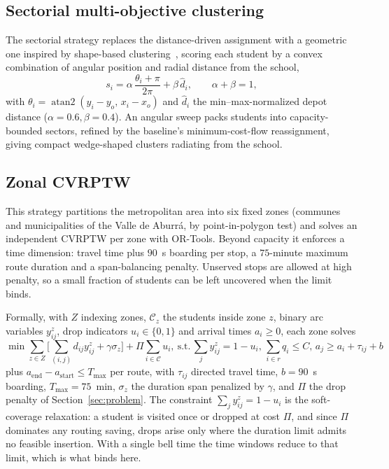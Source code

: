 \documentclass[graybox]{SNmult}
\begin{document}
\subsection{Sectorial multi-objective clustering}
The sectorial strategy replaces the distance-driven assignment with a
geometric one inspired by shape-based
clustering~\cite{CakirRevisitingProblem}, scoring each student by a convex
combination of angular position and radial distance from the school,
\begin{equation}
s_i=\alpha\,\frac{\theta_i+\pi}{2\pi}+\beta\,\hat d_i,
\qquad \alpha+\beta=1,
\label{eq:sectorial-score}
\end{equation}
with $\theta_i=\operatorname{atan2}(y_i-y_o,\,x_i-x_o)$ and $\hat d_i$ the
min--max-normalized depot distance ($\alpha=0.6,\beta=0.4$). An angular
sweep packs students into capacity-bounded sectors, refined by the
baseline's minimum-cost-flow reassignment, giving compact wedge-shaped
clusters radiating from the school.

\subsection{Zonal CVRPTW}\label{sec:cvrptw}
This strategy partitions the metropolitan area into six fixed zones
(communes and municipalities of the Valle de Aburr\'a, by
point-in-polygon test) and solves an independent CVRPTW per zone with
OR-Tools. Beyond capacity it enforces a time dimension: travel time plus
$90$~s boarding per stop, a $75$-minute maximum route duration and a
span-balancing penalty. Unserved stops are allowed at high penalty, so a
small fraction of students can be left uncovered when the limit binds.

Formally, with $Z$ indexing zones, $\mathcal{C}_z$ the students inside
zone $z$, binary arc variables $y^z_{ij}$, drop indicators
$u_i\in\{0,1\}$ and arrival times $a_i\ge0$, each zone solves
\begin{equation}
\min \sum_{z\in Z}\big[\sum_{(i,j)} d_{ij}y^z_{ij} + \gamma\sigma_z\big]
 + \Pi\sum_{i\in\mathcal{C}} u_i
,\ \text{s.t.}\, \textstyle\sum_{j} y^z_{ij} = 1-u_i,\,
\sum_{i\in r} q_i \le C,\, a_j \ge a_i + \tau_{ij} + b
\label{eq:cvrptw}
\end{equation}
plus $a_{\text{end}}-a_{\text{start}}\le T_{\max}$ per route, with
$\tau_{ij}$ directed travel time, $b=90$~s boarding, $T_{\max}=75$~min,
$\sigma_z$ the duration span penalized by $\gamma$, and $\Pi$ the drop
penalty of Section~\ref{sec:problem}. The constraint
$\sum_j y^z_{ij}=1-u_i$ is the soft-coverage relaxation: a student is
visited once or dropped at cost $\Pi$, and since $\Pi$ dominates any
routing saving, drops arise only where the duration limit admits no
feasible insertion. With a single bell time the time windows reduce to
that limit, which is what binds here.
\end{document}
